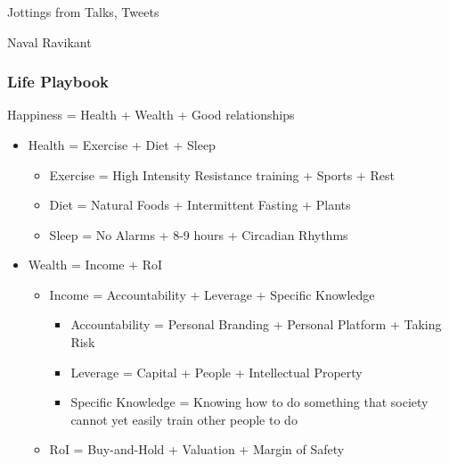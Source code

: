 \begin{frame}[fragile]\frametitle{}
\begin{center}
{\Large Jottings from Talks, Tweets}

{\small Naval Ravikant}


\end{center}
\end{frame}






\begin{frame}[fragile]\frametitle{Life Playbook}

Happiness = Health + Wealth + Good relationships
\begin{itemize}
\item Health = Exercise + Diet + Sleep
		\begin{itemize}
		\item Exercise = High Intensity Resistance training + Sports + Rest
		\item Diet = Natural Foods + Intermittent Fasting + Plants
		\item Sleep = No Alarms + 8-9 hours + Circadian Rhythms
		\end{itemize}

\item Wealth = Income + RoI
		\begin{itemize}
		\item Income = Accountability + Leverage + Specific Knowledge
			\begin{itemize}
			\item Accountability = Personal Branding + Personal Platform + Taking Risk
			\item Leverage = Capital + People + Intellectual Property
			\item Specific Knowledge =  Knowing how to do something that society cannot yet easily train other people to do
			\end{itemize}
		\item RoI = Buy-and-Hold + Valuation + Margin of Safety
		\end{itemize}
\end{itemize}


\end{frame}

